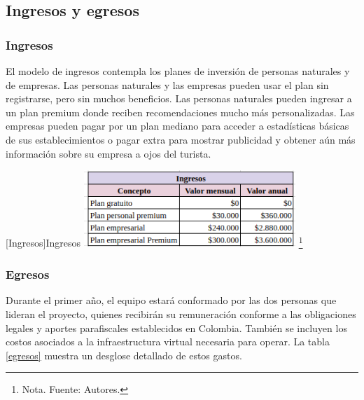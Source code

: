 \subsection{Ingresos y egresos}

\subsubsection{Ingresos}

El modelo de ingresos contempla los planes de inversión de personas naturales y de empresas. Las personas naturales y las empresas pueden usar el plan sin registrarse, pero sin muchos beneficios. Las personas naturales pueden ingresar a un plan premium donde reciben recomendaciones mucho más personalizadas. Las empresas pueden pagar por un plan mediano para acceder a estadísticas básicas de sus establecimientos o pagar extra para mostrar publicidad y obtener aún más información sobre su empresa a ojos del turista.

\vspace{2mm}
\begin{minipage}{0.9\textwidth}
\centering
{}[{Ingresos}]{Ingresos}
\label{Ingresos}
\includegraphics[width=0.6\textwidth]{Content/Images/AF/ingresos.png}
\footnote{Nota. \textup{Fuente: Autores.}}
\end{minipage}

\subsubsection{Egresos}
Durante el primer año, el equipo estará conformado por las dos personas que lideran el proyecto, quienes recibirán su remuneración conforme a las obligaciones legales y aportes parafiscales establecidos en Colombia. También se incluyen los costos asociados a la infraestructura virtual necesaria para operar. La tabla \ref{egresos} muestra un desglose detallado de estos gastos.

